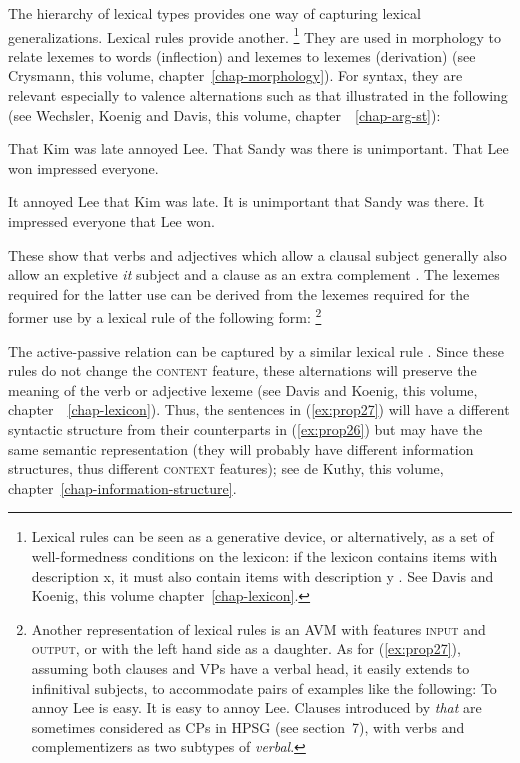 \documentclass[output=paper
	        ,collection
	        ,collectionchapter
 	        ,biblatex
                ,babelshorthands
                ,newtxmath
                ,draftmode
                ,colorlinks, citecolor=brown
]{langscibook}
\begin{document}
The hierarchy of lexical types provides one way of capturing lexical generalizations. Lexical rules provide another.%
%
\footnote{Lexical rules can be seen as a generative device, or alternatively, as a set of well-formedness conditions on the lexicon: if the lexicon contains items with description x, it must also contain items with description y \citep{Meurers2001a}. See Davis and Koenig, this volume chapter~\ref{chap-lexicon}.}
%
They are used in morphology to relate lexemes to words (inflection) and lexemes to lexemes (derivation) (see Crysmann, this volume, chapter~\ref{chap-morphology}). For syntax, they are relevant especially to valence alternations such as that illustrated in the following (see Wechsler, Koenig and Davis, this volume, chapter~ \ref{chap-arg-st}):

\ea\label{ex:prop26}
	\ea That Kim was late annoyed Lee.
	\ex That Sandy was there is unimportant. 
	\ex That Lee won impressed everyone.
	\z
	
\ex\label{ex:prop27}
	\ea It annoyed Lee that Kim was late.
	\ex It is unimportant that Sandy was there. 
	\ex It impressed everyone that Lee won.
	\z
\z

These show that verbs and adjectives which allow a clausal subject generally also allow an expletive \emph{it} subject and a clause as an extra complement \citep[150]{ps2}. The lexemes required for the latter use can be derived from the lexemes required for the former use by a lexical rule of the following form:%
%
\footnote{Another representation of lexical rules is an AVM with features \textsc{input} and \textsc{output}, or with the left hand side as a daughter. As for (\ref{ex:prop27}), assuming both clauses and VPs have a verbal head, it easily extends to infinitival subjects, to accommodate pairs of examples like the following:
	\ea To annoy Lee is easy.
	\ex It is easy to annoy Lee.
	\z
Clauses introduced by \emph{that} are sometimes considered as CPs in HPSG (see section~7), with verbs and complementizers as two subtypes of \emph{verbal}.
	
}
%

\ea\label{ex:prop28}
\avmtmp{[arg-st & <S> \+ \2] $\mapsto$
	[arg-st & <NP![\type{it}]!> \+ \2 \+ <S>]}
\z

The active-passive relation can be captured by a similar lexical rule \citep{Flickinger87}. Since these rules do not change the \textsc{content} feature, these alternations will preserve the meaning of the verb or adjective lexeme (see Davis and Koenig, this volume, chapter~ \ref{chap-lexicon}). Thus, the sentences in (\ref{ex:prop27}) will have a different syntactic structure from their counterparts in (\ref{ex:prop26}) but may have the same semantic representation (they will probably have different information structures, thus different \textsc{context} features); see de Kuthy, this volume, chapter~\ref{chap-information-structure}.
\end{document}
